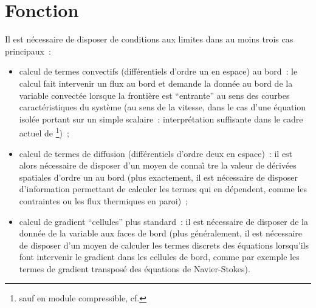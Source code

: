 %
% 
%
% 
% 
% 
%
%


\vspace{1cm}
\section{Fonction}
Il est n\'ecessaire de disposer de conditions aux limites dans au moins 
trois cas principaux~: 
\begin{itemize}
\item calcul de termes convectifs (diff\'erentiels d'ordre un en espace) au
bord~:  le calcul fait intervenir un flux au bord et demande 
la donn\'ee au bord de la variable convect\'ee lorsque la fronti\`ere est
``entrante'' au sens des courbes caract\'eristiques du syst\`eme 
(au sens de la vitesse, dans le cas d'une \'equation isol\'ee portant 
sur un simple scalaire~: interpr\'etation suffisante dans le cadre actuel de
\CS\footnote{sauf en module compressible, cf. })~;
\item calcul de termes de diffusion (diff\'erentiels d'ordre deux en espace)~: 
il est alors n\'ecessaire de disposer d'un moyen de conna\^\i 
tre la valeur 
de d\'eriv\'ees spatiales d'ordre un au bord (plus exactement, il est
n\'ecessaire de disposer d'information permettant de calculer les termes qui en
d\'ependent, comme les contraintes ou les flux thermiques en paroi)~;
\item calcul de gradient ``cellules'' plus standard~: il est n\'ecessaire de disposer de la
donn\'ee de la variable aux faces de bord (plus g\'en\'eralement, il est n\'ecessaire
de disposer d'un moyen de calculer les termes discrets des \'equations 
lorsqu'ils font intervenir le gradient dans les cellules de bord, comme par
exemple les termes de gradient transpos\'e des \'equations de Navier-Stokes).
\end{itemize}

